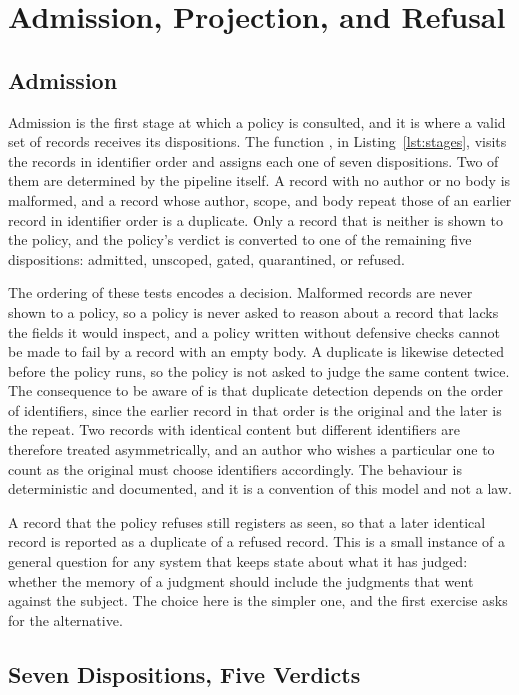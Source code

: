 \chapter{Admission, Projection, and Refusal}
\label{ch:admission}

\section{Admission}

Admission is the first stage at which a policy is consulted, and it is where a valid set of records receives its dispositions. The function , in Listing~\ref{lst:stages}, visits the records in identifier order and assigns each one of seven dispositions. Two of them are determined by the pipeline itself. A record with no author or no body is malformed, and a record whose author, scope, and body repeat those of an earlier record in identifier order is a duplicate. Only a record that is neither is shown to the policy, and the policy's verdict is converted to one of the remaining five dispositions: admitted, unscoped, gated, quarantined, or refused.

The ordering of these tests encodes a decision. Malformed records are never shown to a policy, so a policy is never asked to reason about a record that lacks the fields it would inspect, and a policy written without defensive checks cannot be made to fail by a record with an empty body. A duplicate is likewise detected before the policy runs, so the policy is not asked to judge the same content twice. The consequence to be aware of is that duplicate detection depends on the order of identifiers, since the earlier record in that order is the original and the later is the repeat. Two records with identical content but different identifiers are therefore treated asymmetrically, and an author who wishes a particular one to count as the original must choose identifiers accordingly. The behaviour is deterministic and documented, and it is a convention of this model and not a law.

A record that the policy refuses still registers as seen, so that a later identical record is reported as a duplicate of a refused record. This is a small instance of a general question for any system that keeps state about what it has judged: whether the memory of a judgment should include the judgments that went against the subject. The choice here is the simpler one, and the first exercise asks for the alternative.

\section{Seven Dispositions, Five Verdicts}

